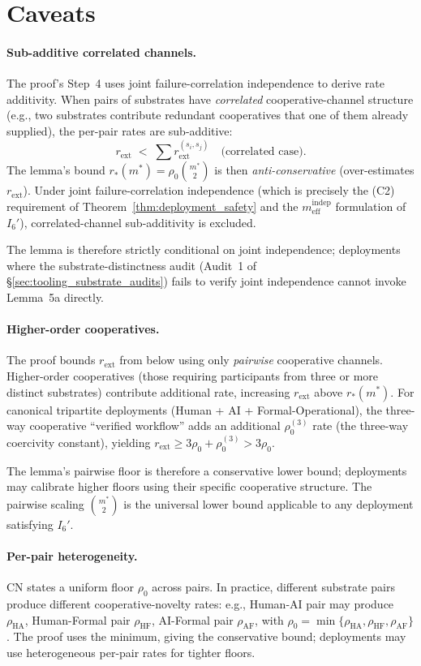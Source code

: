 \documentclass{article}
\newcommand{\rext}{r_{\mathrm{ext}}}
\newcommand{\mindep}{m_{\mathrm{eff}}^{\mathrm{indep}}}
\begin{document}
\section{Caveats}

\paragraph{Sub-additive correlated channels.}
The proof's Step~4 uses joint failure-correlation independence to
derive rate additivity.  When pairs of substrates have
\emph{correlated} cooperative-channel structure (e.g., two
substrates contribute redundant cooperatives that one of them
already supplied), the per-pair rates are sub-additive:
\[
  \rext \;<\; \sum \rext^{(s_i, s_j)} \quad \text{(correlated case)}.
\]
The lemma's bound $r_*(m^*) = \rho_0 \binom{m^*}{2}$ is then
\emph{anti-conservative} (over-estimates $\rext$).  Under joint
failure-correlation independence (which is precisely the (C2)
requirement of Theorem~\ref{thm:deployment_safety} and the
$\mindep$ formulation of $I_6'$), correlated-channel sub-additivity
is excluded.

The lemma is therefore strictly conditional on joint independence;
deployments where the substrate-distinctness audit (Audit~1 of
\S\ref{sec:tooling_substrate_audits}) fails to verify joint
independence cannot invoke Lemma~5a directly.

\paragraph{Higher-order cooperatives.}
The proof bounds $\rext$ from below using only \emph{pairwise}
cooperative channels.  Higher-order cooperatives (those requiring
participants from three or more distinct substrates) contribute
additional rate, increasing $\rext$ above $r_*(m^*)$.  For canonical
tripartite deployments (Human + AI + Formal-Operational), the
three-way cooperative ``verified workflow'' adds an additional
$\rho_0^{(3)}$ rate (the three-way coercivity constant), yielding
$\rext \geq 3 \rho_0 + \rho_0^{(3)} > 3\rho_0$.

The lemma's pairwise floor is therefore a conservative lower bound;
deployments may calibrate higher floors using their specific
cooperative structure.  The pairwise scaling $\binom{m^*}{2}$ is
the universal lower bound applicable to any deployment satisfying
$I_6'$.

\paragraph{Per-pair heterogeneity.}
CN states a uniform floor $\rho_0$ across pairs.  In practice,
different substrate pairs produce different cooperative-novelty
rates: e.g., Human-AI pair may produce $\rho_{\mathrm{HA}}$,
Human-Formal pair $\rho_{\mathrm{HF}}$, AI-Formal pair
$\rho_{\mathrm{AF}}$, with $\rho_0 = \min\{\rho_{\mathrm{HA}},
\rho_{\mathrm{HF}}, \rho_{\mathrm{AF}}\}$.  The proof uses the
minimum, giving the conservative bound; deployments may use
heterogeneous per-pair rates for tighter floors.
\end{document}
